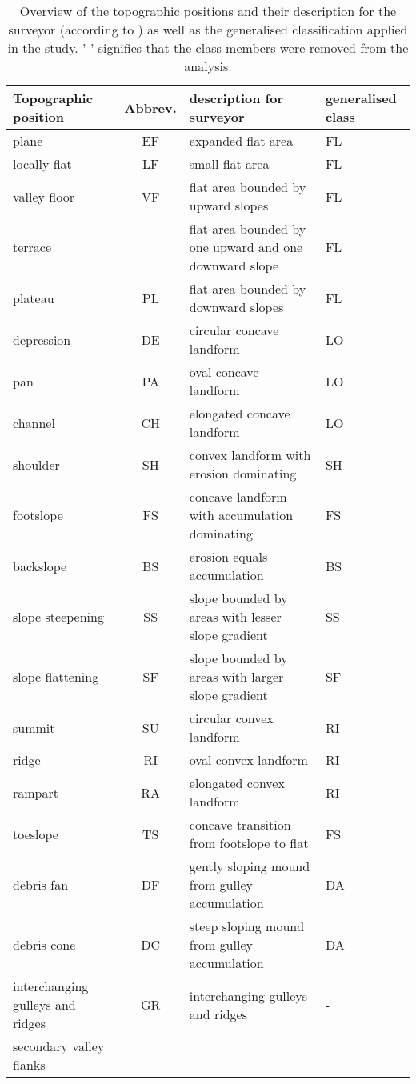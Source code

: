 \documentclass[preprint,12pt,authoryear]{elsarticle}
\begin{document}
\begin{table}[!htbp]

\caption{Overview of the topographic positions and their description for the surveyor (according to \cite{Englisch1998}) as well as the generalised classification applied in the study. '-' signifies that the class members were removed from the analysis.}
\begin{center}   
\small
\begin{tabular}{  p{2.0cm} c p{7cm} p{1.5cm} }
	\hline
	Topographic position & Abbrev. & description for surveyor & generalised class \\ \hline
	plane &EF& expanded flat area  & FL \\ \hline
	locally flat &LF&	small flat area  & FL \\  \hline
	valley floor &VF& flat area bounded by upward slopes  & FL \\  \hline
	\raisebox{-0ex} {terrace} &\raisebox{-0ex}{TE} & flat area bounded by one upward and one downward slope  & FL \\   \hline
	plateau &PL& flat area bounded by downward slopes  & FL \\   \hline
	depression &DE& circular concave landform & LO \\   \hline
	pan &PA& oval concave landform & LO  \\   \hline
	channel &CH& elongated concave landform  & LO\\   \hline
	shoulder &SH& convex landform with erosion dominating & SH \\   \hline
	footslope &FS& concave landform with accumulation dominating  & FS\\   \hline
	backslope &BS& erosion equals accumulation & BS  \\   \hline
	slope steepening &SS& slope bounded by areas with lesser slope gradient  & SS \\   \hline
	slope flattening &SF& slope bounded by areas with larger slope gradient & SF \\   \hline
 	summit &SU& circular convex landform & RI \\   \hline
	ridge &RI& oval convex landform  & RI\\   \hline
	rampart &RA& elongated convex landform  & RI\\   \hline
	toeslope &TS& concave transition from footslope to flat & FS \\   \hline
	debris fan &DF& gently sloping mound from gulley accumulation & DA  \\   \hline
	debris cone &DC& steep sloping mound from gulley accumulation  & DA\\   \hline
	interchanging gulleys and ridges &\raisebox{-1.5ex} {GR} & \raisebox {-1.5ex} {interchanging gulleys and ridges} & -  \\  \hline
	secondary valley flanks &\raisebox{-1.5ex}{SV}& \raisebox{-1.5ex}{secondary valley flanks}  & - \\   \hline
    \end{tabular}
\end{center}	
\label{table:topopositions}
\end{table}
\end{document}
